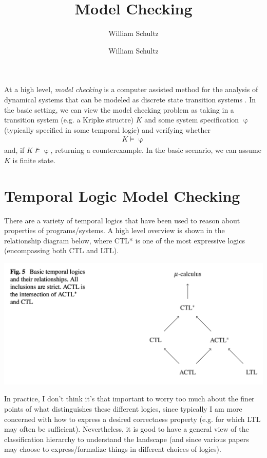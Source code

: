 \documentclass[10pt,a4paper]{article}
\author{William Schultz}
\begin{document}
\title{Model Checking}
\author{William Schultz}
\maketitle

At a high level, \textit{model checking} is a computer assisted method for the analysis of dynamical systems that can be modeled as discrete state transition systems \cite{Clarke2018ch1}. In the basic setting, we can view the model checking problem as taking in a transition system (e.g. a Kripke structre) $K$ and some system specification $\upvarphi$ (typically specified in some temporal logic)  and verifying whether 
\begin{align*}
    K \vDash \upvarphi
\end{align*}
and, if $K \nvDash \upvarphi$, returning a counterexample. In the basic scenario, we can assume $K$ is finite state.

\section{Temporal Logic Model Checking}

There are a variety of temporal logics that have been used to reason about properties of programs/systems. A high level overview is shown in the relationship diagram below, where CTL* is one of the most expressive logics (encompassing both CTL and LTL).
\begin{center}
    \includegraphics[scale=0.3]{images/temp-logics.png}
\end{center}
In practice, I don't think it's that important to worry too much about the finer points of what distinguishes these different logics, since typically I am more concerned with how to express a desired correctness property (e.g. for which LTL may often be sufficient). Nevertheless, it is good to have a general view of the classification hierarchy to understand the landscape (and since various papers may choose to express/formalize things in different choices of logics).
\end{document}
